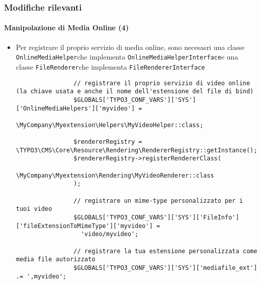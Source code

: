 \begin{frame}[fragile]
	\frametitle{Modifiche rilevanti}
	\framesubtitle{Manipolazione di Media Online (4)}

	\lstset{basicstyle=\tiny\ttfamily}

	\begin{itemize}

		\item Per registrare il proprio servizio di media online, sono necesasri una classe
			\small\texttt{OnlineMediaHelper}\normalsize\space che implementa
			\small\texttt{OnlineMediaHelperInterface}\normalsize\space e una classe
			\small\texttt{FileRenderer}\normalsize\space che implementa
			\small\texttt{FileRendererInterface}\normalsize\space

			\begin{lstlisting}
				// registrare il proprio servizio di video online (la chiave usata e anche il nome dell'estensione del file di bind)
				$GLOBALS['TYPO3_CONF_VARS']['SYS']['OnlineMediaHelpers']['myvideo'] =
				  \MyCompany\Myextension\Helpers\MyVideoHelper::class;

				$rendererRegistry = \TYPO3\CMS\Core\Resource\Rendering\RendererRegistry::getInstance();
				$rendererRegistry->registerRendererClass(
				  \MyCompany\Myextension\Rendering\MyVideoRenderer::class
				);

				// registrare un mime-type personalizzato per i tuoi video
				$GLOBALS['TYPO3_CONF_VARS']['SYS']['FileInfo']['fileExtensionToMimeType']['myvideo'] =
				  'video/myvideo';

				// registrare la tua estensione personalizzata come media file autorizzato
				$GLOBALS['TYPO3_CONF_VARS']['SYS']['mediafile_ext'] .= ',myvideo';
			\end{lstlisting}

	\end{itemize}

\end{frame}


